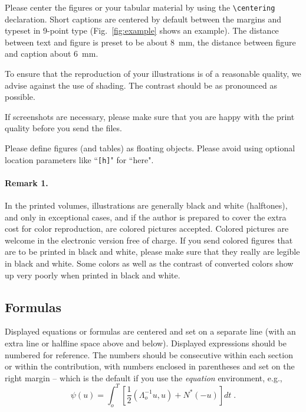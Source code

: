 \documentclass[runningheads,a4paper]{llncs}
\begin{document}
Please center the figures or your tabular material by using the \verb+\centering+
declaration. Short captions are centered by default between the margins
and typeset in 9-point type (Fig.~\ref{fig:example} shows an example).
The distance between text and figure is preset to be about 8~mm, the
distance between figure and caption about 6~mm.

To ensure that the reproduction of your illustrations is of a reasonable
quality, we advise against the use of shading. The contrast should be as
pronounced as possible.

If screenshots are necessary, please make sure that you are happy with
the print quality before you send the files.

Please define figures (and tables) as floating objects. Please avoid
using optional location parameters like ``\verb+[h]+" for ``here".

\paragraph{Remark 1.}

In the printed volumes, illustrations are generally black and white
(halftones), and only in exceptional cases, and if the author is
prepared to cover the extra cost for color reproduction, are colored
pictures accepted. Colored pictures are welcome in the electronic
version free of charge. If you send colored figures that are to be
printed in black and white, please make sure that they really are
legible in black and white. Some colors as well as the contrast of
converted colors show up very poorly when printed in black and white.

\subsection{Formulas}

Displayed equations or formulas are centered and set on a separate
line (with an extra line or halfline space above and below). Displayed
expressions should be numbered for reference. The numbers should be
consecutive within each section or within the contribution,
with numbers enclosed in parentheses and set on the right margin --
which is the default if you use the \emph{equation} environment, e.g.,
\begin{equation}
  \psi (u) = \int_{o}^{T} \left[\frac{1}{2}
  \left(\Lambda_{o}^{-1} u,u\right) + N^{\ast} (-u)\right] dt \;  .
\end{equation}
\end{document}
